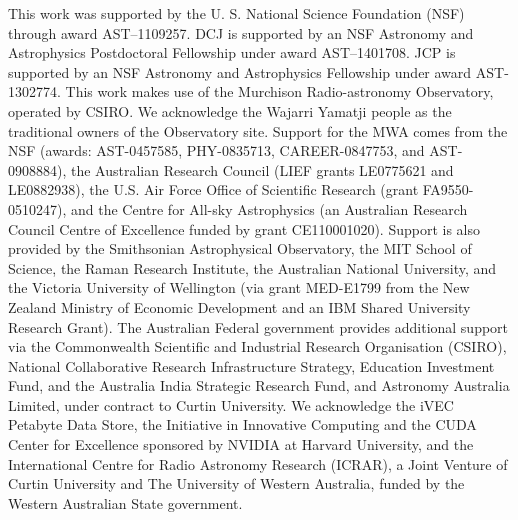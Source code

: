 \documentclass[preprint2,iop,numberedappendix]{emulateapj}
\begin{document}
This work was supported by the U. S. National Science Foundation (NSF) through award AST--1109257. DCJ is supported by an NSF Astronomy and Astrophysics Postdoctoral Fellowship under award AST--1401708. JCP is supported by an NSF Astronomy and Astrophysics Fellowship under award AST-1302774. This work makes use of the Murchison Radio-astronomy Observatory, operated by CSIRO. We acknowledge the Wajarri Yamatji people as the traditional owners of the Observatory site. Support for the MWA comes from the NSF (awards: AST-0457585, PHY-0835713, CAREER-0847753, and AST-0908884), the Australian Research Council (LIEF grants LE0775621 and LE0882938), the U.S. Air Force Office of Scientific Research (grant FA9550-0510247), and the Centre for All-sky Astrophysics (an Australian Research Council Centre of Excellence funded by grant CE110001020). Support is also provided by the Smithsonian Astrophysical Observatory, the MIT School of Science, the Raman Research Institute, the Australian National University, and the Victoria University of Wellington (via grant MED-E1799 from the New Zealand Ministry of Economic Development and an IBM Shared University Research Grant). The Australian Federal government provides additional support via the Commonwealth Scientific and Industrial Research Organisation (CSIRO), National Collaborative Research Infrastructure Strategy, Education Investment Fund, and the Australia India Strategic Research Fund, and Astronomy Australia Limited, under contract to Curtin University. We acknowledge the iVEC Petabyte Data Store, the Initiative in Innovative Computing and the CUDA Center for Excellence sponsored by NVIDIA at Harvard University, and the International Centre for Radio Astronomy Research (ICRAR), a Joint Venture of Curtin University and The University of Western Australia, funded by the Western Australian State government.  

\par\bigskip


\end{document}
